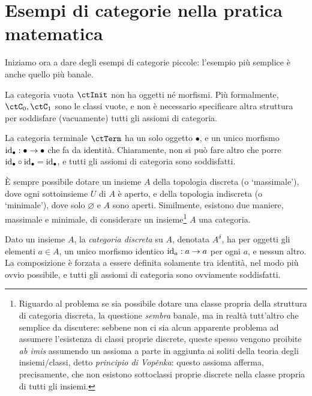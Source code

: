 \section{Esempi di categorie nella pratica matematica}\label{sec_esempi_cats}
Iniziamo ora a dare degli esempi di categorie piccole: l'esempio più semplice è anche quello più banale.
\begin{example}\label{ex_cat_vuota}
	La categoria vuota \(\ctInit\) non ha oggetti né morfismi. Più formalmente, \(\ctC_0,\ctC_1\) sono le classi vuote, e non è necessario specificare altra struttura per soddisfare (vacuamente) tutti gli assiomi di categoria.
\end{example}
\begin{example}\label{ex_cat_term}
	La categoria terminale \(\ctTerm\) ha un solo oggetto \(\bullet\), e un unico morfismo \(\mathrm{id}_\bullet : \bullet\to\bullet\) che fa da identità. Chiaramente, non si può fare altro che porre \(\mathrm{id}_\bullet\circ\mathrm{id}_\bullet=\mathrm{id}_\bullet\), e tutti gli assiomi di categoria sono soddisfatti.
\end{example}
\`E sempre possibile dotare un insieme \(A\) della topologia discreta (o `massimale'), dove ogni sottoinsieme \(U\) di \(A\) è aperto, e della topologia indiscreta (o `minimale'), dove solo \(\varnothing\) e \(A\) sono aperti. Similmente, esistono due maniere, massimale e minimale, di considerare un insieme\footnote{Riguardo al problema se sia possibile dotare una classe propria della struttura di categoria discreta, la questione \emph{sembra} banale, ma in realtà tutt'altro che semplice da discutere: sebbene non ci sia alcun apparente problema ad assumere l'esistenza di classi proprie discrete, queste spesso vengono proibite \emph{ab imis} assumendo un assioma a parte in aggiunta ai soliti della teoria degli insiemi/classi, detto \emph{principio di Vop\v enka}: questo assioma afferma, precisamente, che non esistono sottoclassi proprie discrete nella classe propria di tutti gli insiemi.} \(A\) una categoria.
\begin{example}\label{ex_cat_discreta}
	Dato un insieme \(A\), la \emph{categoria discreta} su \(A\), denotata \(A^\delta\), ha per oggetti gli elementi \(a\in A\), un unico morfismo identico \(\mathrm{id}_a : a\to a\) per ogni \(a\), e nessun altro. La composizione è forzata a essere definita solamente tra identità, nel modo più ovvio possibile, e tutti gli assiomi di categoria sono ovviamente soddisfatti.
\end{example}
